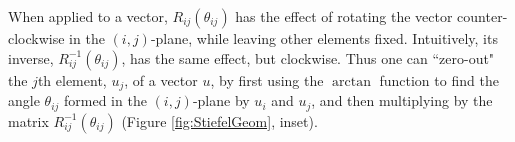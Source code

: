 \documentclass[ba]{imsart}
\numberwithin{equation}{section}
\theoremstyle{plain}
\begin{document}
\noindent When applied to a vector, $R_{ij}(\theta_{ij})$ has the effect of rotating the vector counter-clockwise in the $(i,j)$-plane, while leaving other elements fixed. Intuitively, its inverse, $R_{ij}^{-1}(\theta_{ij})$, has the same effect, but clockwise. Thus one can ``zero-out" the $j$th element, $u_j$, of a vector $u$, by first using the $\arctan$ function to find the angle $\theta_{ij}$ formed in the $(i,j)$-plane by $u_i$ and $u_j$, and then multiplying by the matrix $R_{ij}^{-1}(\theta_{ij})$ (Figure \ref{fig:StiefelGeom}, inset).

\end{document}
